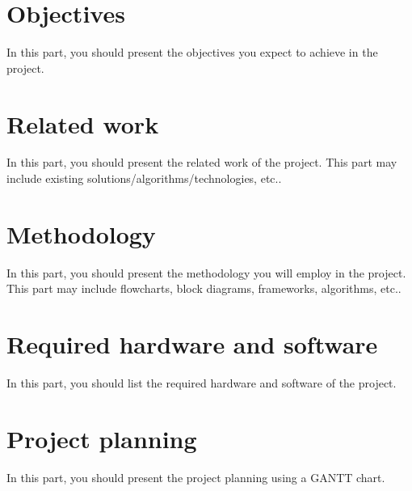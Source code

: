 \documentclass[12pt]{article}
\begin{document}
\clearpage
\section{Objectives}
\label{sec:objectives}
In this part, you should present the objectives you expect to achieve in the project.



\clearpage
\section{Related work}
\label{sec:related-work}
In this part, you should present the related work of the project. This part may include existing solutions/algorithms/technologies, etc.. 

\clearpage
\section{Methodology}
\label{sec:methodology}
In this part, you should present the methodology you will employ in the project. This part may include flowcharts, block diagrams, frameworks, algorithms, etc..

\clearpage
\section{Required hardware and software}
\label{sec:hardware-software}
In this part, you should list the required hardware and software of the project.

\clearpage
\section{Project planning}
\label{sec:project-planning}
In this part, you should present the project planning using a GANTT chart.


\clearpage



\end{document}
